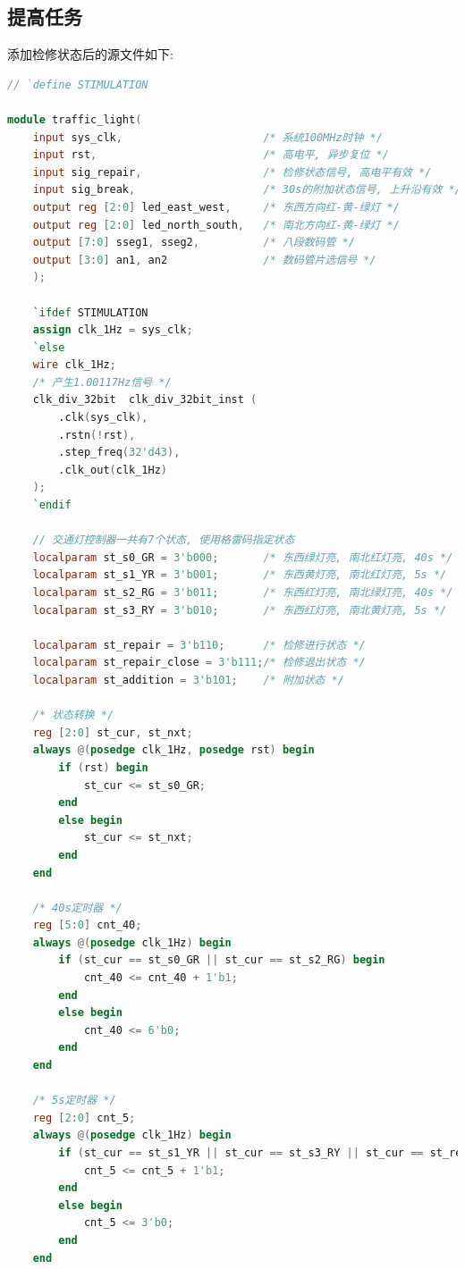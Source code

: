\documentclass{article}
\begin{document}
\subsection*{提高任务}
添加检修状态后的源文件如下:
\begin{lstlisting}[language=Verilog, caption={检修状态源文件}]
// `define STIMULATION

module traffic_light(
    input sys_clk,                      /* 系统100MHz时钟 */
    input rst,                          /* 高电平, 异步复位 */
    input sig_repair,                   /* 检修状态信号, 高电平有效 */
    input sig_break,                    /* 30s的附加状态信号, 上升沿有效 */
    output reg [2:0] led_east_west,     /* 东西方向红-黄-绿灯 */
    output reg [2:0] led_north_south,   /* 南北方向红-黄-绿灯 */
    output [7:0] sseg1, sseg2,          /* 八段数码管 */
    output [3:0] an1, an2               /* 数码管片选信号 */
    );
    
    `ifdef STIMULATION
    assign clk_1Hz = sys_clk;
    `else
    wire clk_1Hz;
    /* 产生1.00117Hz信号 */
    clk_div_32bit  clk_div_32bit_inst (
        .clk(sys_clk),
        .rstn(!rst),
        .step_freq(32'd43),
        .clk_out(clk_1Hz)
    );
    `endif

    // 交通灯控制器一共有7个状态, 使用格雷码指定状态
    localparam st_s0_GR = 3'b000;       /* 东西绿灯亮, 南北红灯亮, 40s */
    localparam st_s1_YR = 3'b001;       /* 东西黄灯亮, 南北红灯亮, 5s */
    localparam st_s2_RG = 3'b011;       /* 东西红灯亮, 南北绿灯亮, 40s */
    localparam st_s3_RY = 3'b010;       /* 东西红灯亮, 南北黄灯亮, 5s */

    localparam st_repair = 3'b110;      /* 检修进行状态 */
    localparam st_repair_close = 3'b111;/* 检修退出状态 */
    localparam st_addition = 3'b101;    /* 附加状态 */

    /* 状态转换 */
    reg [2:0] st_cur, st_nxt;
    always @(posedge clk_1Hz, posedge rst) begin
        if (rst) begin
            st_cur <= st_s0_GR;
        end
        else begin
            st_cur <= st_nxt;
        end
    end

    /* 40s定时器 */
    reg [5:0] cnt_40;
    always @(posedge clk_1Hz) begin
        if (st_cur == st_s0_GR || st_cur == st_s2_RG) begin
            cnt_40 <= cnt_40 + 1'b1;
        end
        else begin
            cnt_40 <= 6'b0;
        end
    end

    /* 5s定时器 */
    reg [2:0] cnt_5;
    always @(posedge clk_1Hz) begin
        if (st_cur == st_s1_YR || st_cur == st_s3_RY || st_cur == st_repair_close) begin
            cnt_5 <= cnt_5 + 1'b1;
        end
        else begin
            cnt_5 <= 3'b0;
        end
    end


\end{lstlisting}
\end{document}
